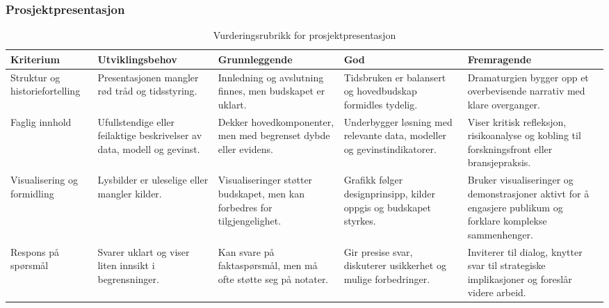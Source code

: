 \subsubsection{Prosjektpresentasjon}
\begin{table}[h]
    \centering
    \caption{Vurderingsrubrikk for prosjektpresentasjon}
    \label{tab:rubrikk-presentasjon}
    \begin{tabular}{p{2.8cm}p{3.0cm}p{3.0cm}p{3.0cm}p{3.0cm}}
        \toprule
        \textbf{Kriterium} & \textbf{Utviklingsbehov} & \textbf{Grunnleggende} & \textbf{God} & \textbf{Fremragende} \\
        \midrule
        Struktur og historiefortelling & Presentasjonen mangler rød tråd og tidsstyring. & Innledning og avslutning finnes, men budskapet er uklart. & Tidsbruken er balansert og hovedbudskap formidles tydelig. & Dramaturgien bygger opp et overbevisende narrativ med klare overganger. \\
        Faglig innhold & Ufullstendige eller feilaktige beskrivelser av data, modell og gevinst. & Dekker hovedkomponenter, men med begrenset dybde eller evidens. & Underbygger løsning med relevante data, modeller og gevinstindikatorer. & Viser kritisk refleksjon, risikoanalyse og kobling til forskningsfront eller bransjepraksis. \\
        Visualisering og formidling & Lysbilder er uleselige eller mangler kilder. & Visualiseringer støtter budskapet, men kan forbedres for tilgjengelighet. & Grafikk følger designprinsipp, kilder oppgis og budskapet styrkes. & Bruker visualiseringer og demonstrasjoner aktivt for å engasjere publikum og forklare komplekse sammenhenger. \\
        Respons på spørsmål & Svarer uklart og viser liten innsikt i begrensninger. & Kan svare på faktaspørsmål, men må ofte støtte seg på notater. & Gir presise svar, diskuterer usikkerhet og mulige forbedringer. & Inviterer til dialog, knytter svar til strategiske implikasjoner og foreslår videre arbeid. \\
        \bottomrule
    \end{tabular}
\end{table}

